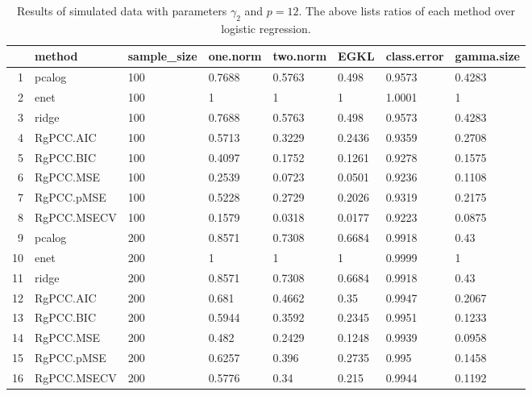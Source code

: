\begin{table}[ht]
\centering
\begin{tabular}{rlllllll}
  \hline
 & method & sample\_size & one.norm & two.norm & EGKL & class.error & gamma.size \\ 
  \hline
1 & pcalog & 100 & 0.7688 & 0.5763 & 0.498 & 0.9573 & 0.4283 \\ 
  2 & enet & 100 & 1 & 1 & 1 & 1.0001 & 1 \\ 
  3 & ridge & 100 & 0.7688 & 0.5763 & 0.498 & 0.9573 & 0.4283 \\ 
  4 & RgPCC.AIC & 100 & 0.5713 & 0.3229 & 0.2436 & 0.9359 & 0.2708 \\ 
  5 & RgPCC.BIC & 100 & 0.4097 & 0.1752 & 0.1261 & 0.9278 & 0.1575 \\ 
  6 & RgPCC.MSE & 100 & 0.2539 & 0.0723 & 0.0501 & 0.9236 & 0.1108 \\ 
  7 & RgPCC.pMSE & 100 & 0.5228 & 0.2729 & 0.2026 & 0.9319 & 0.2175 \\ 
  8 & RgPCC.MSECV & 100 & 0.1579 & 0.0318 & 0.0177 & 0.9223 & 0.0875 \\ 
  9 & pcalog & 200 & 0.8571 & 0.7308 & 0.6684 & 0.9918 & 0.43 \\ 
  10 & enet & 200 & 1 & 1 & 1 & 0.9999 & 1 \\ 
  11 & ridge & 200 & 0.8571 & 0.7308 & 0.6684 & 0.9918 & 0.43 \\ 
  12 & RgPCC.AIC & 200 & 0.681 & 0.4662 & 0.35 & 0.9947 & 0.2067 \\ 
  13 & RgPCC.BIC & 200 & 0.5944 & 0.3592 & 0.2345 & 0.9951 & 0.1233 \\ 
  14 & RgPCC.MSE & 200 & 0.482 & 0.2429 & 0.1248 & 0.9939 & 0.0958 \\ 
  15 & RgPCC.pMSE & 200 & 0.6257 & 0.396 & 0.2735 & 0.995 & 0.1458 \\ 
  16 & RgPCC.MSECV & 200 & 0.5776 & 0.34 & 0.215 & 0.9944 & 0.1192 \\ 
   \hline
\end{tabular}
\caption{Results of simulated data with parameters $\gamma_2$ and $p =12$. The above lists ratios of each method over logistic regression.} 
\label{fig-2-lead-12-metrics-pratio}
\end{table}
